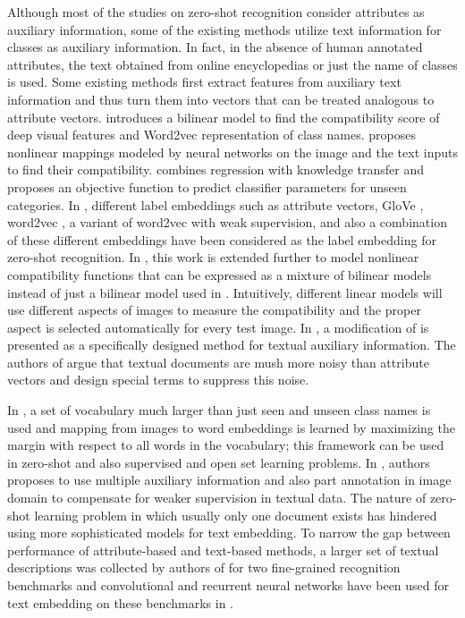 \documentclass[10pt,twocolumn,letterpaper]{article}
\begin{document}
 Although most of the studies on zero-shot recognition consider attributes as auxiliary information, some of the existing methods utilize text information for classes as auxiliary information. In fact, in the absence of human annotated attributes, the text obtained from online encyclopedias or just the name of classes is used. Some existing methods first extract features from auxiliary text information and thus turn them into vectors that can be treated analogous to attribute vectors.
 \cite{devise} introduces a bilinear model to find the compatibility score of deep visual features and Word2vec \cite{word2vec} representation of class names. \cite{ba2015} proposes nonlinear mappings modeled by neural networks on the image and the text inputs to find their compatibility. \cite{mohamed13} combines regression with knowledge transfer and proposes an objective function to predict classifier parameters for unseen categories.
 In \cite{Akata2015}, different label embeddings such as attribute vectors, GloVe \cite{pennington2014glove}, word2vec \cite{word2vec}, a variant of word2vec with weak supervision, and also a combination of these different embeddings have been considered as the label embedding for zero-shot recognition. In \cite{Xian2016}, this work is extended further to model nonlinear compatibility functions that can be expressed as a mixture of bilinear models instead of just a bilinear model used in \cite{Akata2015}. Intuitively, different linear models will use different aspects of images to measure the compatibility and the proper aspect is selected automatically for every test image.
  In \cite{Qiao2016}, a modification of \cite{emb15} is presented as a specifically designed method for textual auxiliary information. The authors of \cite{Qiao2016}
  argue that textual documents are mush more noisy than attribute vectors and design special terms to suppress this noise.

In \cite{Fu2016}, a set of vocabulary much larger than just seen and unseen class names is used and mapping from images to word embeddings is learned
by  maximizing the margin with respect to all words in the vocabulary; this framework can be used in zero-shot and also supervised and open set learning problems.
In  \cite{Akata2016}, authors proposes to use multiple auxiliary information and also  part annotation in image domain to compensate for weaker supervision in textual data.
The nature of zero-shot learning problem in which usually only one document exists has hindered using more sophisticated models for text embedding.
To narrow the gap between performance of attribute-based and text-based methods, a larger set of textual descriptions was collected
by authors of \cite{Akata2016rnn} for two fine-grained recognition benchmarks and convolutional and recurrent neural networks have been used for text embedding on these benchmarks in \cite{Akata2016rnn}.
\end{document}
